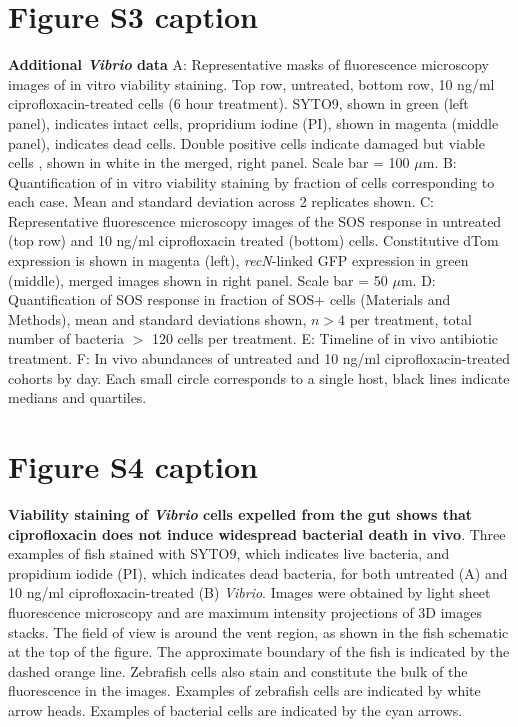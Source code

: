 \section*{Figure S3 caption}
\textbf{Additional \textit{Vibrio} data}  A: Representative masks of fluorescence microscopy images of in vitro viability staining. Top row, untreated, bottom row, 10 ng/ml ciprofloxacin-treated cells (6 hour treatment). SYTO9, shown in green (left panel), indicates intact cells, propridium iodine (PI), shown in magenta (middle panel), indicates dead cells. Double positive cells indicate damaged but viable cells \cite{ben2005genetic}, shown in white in the merged, right panel. Scale bar = 100 $\mu$m. B: Quantification of in vitro viability staining by fraction of cells corresponding to each case. Mean and standard deviation across 2 replicates shown. C: Representative fluorescence microscopy images of the SOS response in untreated (top row) and 10 ng/ml ciprofloxacin treated (bottom) cells. Constitutive dTom expression is shown in magenta (left), \textit{recN}-linked GFP expression in green (middle), merged images shown in right panel. Scale bar = 50 $\mu$m. D: Quantification of SOS response in fraction of SOS+ cells (Materials and Methods), mean and standard deviations shown, $n>4$ per treatment, total number of bacteria $>$ 120 cells per treatment. E: Timeline of in vivo antibiotic treatment. F: In vivo abundances of untreated and 10 ng/ml ciprofloxacin-treated cohorts by day. Each small circle corresponds to a single host, black lines indicate medians and quartiles. 

\section*{Figure S4 caption}
\textbf{Viability staining of \textit{Vibrio} cells expelled from the gut shows that ciprofloxacin does not induce widespread bacterial death in vivo}. Three examples of fish stained with SYTO9, which indicates live bacteria, and propidium iodide (PI), which indicates dead bacteria, for both untreated (A) and 10 ng/ml ciprofloxacin-treated (B) \textit{Vibrio}. Images were obtained by light sheet fluorescence microscopy and are maximum intensity projections of 3D images stacks. The field of view is around the vent region, as shown in the fish schematic at the top of the figure. The approximate boundary of the fish is indicated by the dashed orange line. Zebrafish cells also stain and constitute the bulk of the fluorescence in the images. Examples of zebrafish cells are indicated by white arrow heads. Examples of bacterial cells are indicated by the cyan arrows.


